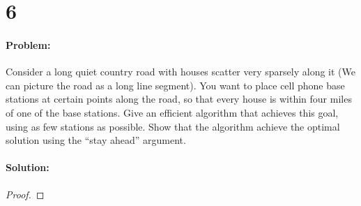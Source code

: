 \documentclass[12pt]{article}
\begin{document}
\section*{6}
\paragraph{Problem:}
Consider a long quiet country road with houses scatter very sparsely along
it (We can picture the road as a long line segment). You want to place cell
phone base stations at certain points along the road, so that every house
is within four miles of one of the base stations.
Give an efficient algorithm that achieves this goal, using as few stations
as possible. Show that the algorithm achieve the optimal solution using
the “stay ahead” argument.

\paragraph{Solution:}
\begin{proof}

\end{proof}
\end{document}
